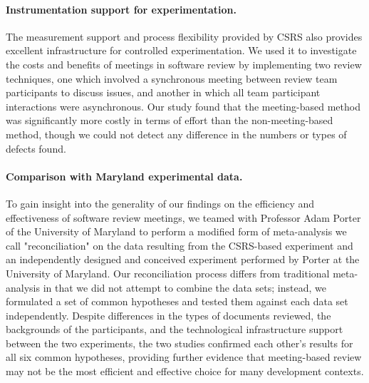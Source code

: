 \vspace*{-.15in} \paragraph{Instrumentation support for experimentation.}  The measurement support and process flexibility provided by CSRS also
provides excellent infrastructure for controlled experimentation.  We used
it to investigate the costs and benefits of meetings in software review by
implementing two review techniques, one which involved a synchronous
meeting between review team participants to discuss issues, and another in
which all team participant interactions were asynchronous.  Our study found
that the meeting-based method was significantly more costly in terms of
effort than the non-meeting-based method, though we could not detect
any difference in the numbers or types of defects found.
 
\vspace*{-.15in} \paragraph{Comparison with Maryland experimental data.}  
To gain insight into the generality of our findings on the efficiency and
effectiveness of software review meetings, we teamed with Professor Adam
Porter of the University of Maryland to perform a modified form of
meta-analysis we call "reconciliation" on the data resulting from the
CSRS-based experiment and an independently designed and conceived
experiment performed by Porter at the University of Maryland.  Our
reconciliation process differs from traditional meta-analysis in that we
did not attempt to combine the data sets; instead, we formulated a set of
common hypotheses and tested them against each data set independently.
Despite differences in the types of documents reviewed, the backgrounds of
the participants, and the technological infrastructure support between the
two experiments, the two studies confirmed each other's results for all six
common hypotheses, providing further evidence that meeting-based review may
not be the most efficient and effective choice for many development
contexts.
  
